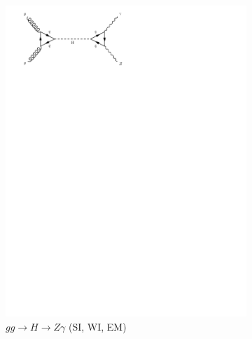 \begin{figure}[h]
\begin{subfigure}[b]{0.3\textwidth}
    \includegraphics[trim={0.5cm 22cm 10cm 0cm},width=\textwidth]{../Diagrams/D17.pdf}
    \caption{$gg \rightarrow H \rightarrow Z\gamma$ (SI, WI, EM)}
    \label{fey:17}
  \end{subfigure}%
  ~
  \begin{subfigure}[b]{0.3\textwidth}

\end{subfigure}
\end{figure}
